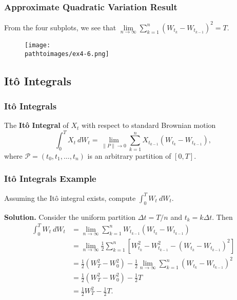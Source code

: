 \documentclass{beamer}
\newcommand{\pathtoimages}{/Users/charlesrambo/Desktop/Bootcamp24/Images}
\begin{document}
\begin{frame}[fragile]
\frametitle{Approximate Quadratic Variation Result}
From the four subplots, we see that $\lim\limits_{n\to\infty} \sum_{k = 1}^n \left(W_{t_k} - W_{t_{k - 1}}\right)^2 = T$.
\begin{figure}
\centering
\texttt{[image: \\pathtoimages/ex4-6.png]}
\end{figure}
\end{frame}



\subsection{It\^o Integrals}

\begin{frame}
\frametitle{It\^o Integrals}
\begin{Definition}
The {\bf It\^o Integral} of $X_t$ with respect to standard Brownian motion
$$
\int_0^T X_t\ dW_t = \lim_{\| P\|\to 0} \sum_{k = 1}^{n } X_{t_{k - 1}} (W_{t_k} - W_{t_{k - 1}}),
$$
where $\mathcal{P} = (t_0, t_1,\ldots, t_n)$ is an arbitrary partition of $[0, T]$.
\end{Definition}

\end{frame}

\begin{frame}
\frametitle{It\^o Integrals Example}
\small 
\begin{Example}
Assuming the It\^o integral exists, compute $\int_0^T W_t\ dW_t$.
\end{Example}

{\bf Solution.}
Consider the uniform partition $\Delta t = T/n$ and $t_k = k \Delta t$. Then
\begin{align*}
\int_0^ T W_t\ dW_t 	&= \lim_{n\to\infty}\sum_{k = 1}^n W_{t_{k - 1}} \left(W_{t_k} - W_{t_{k - 1}}\right)\\
				&= \lim_{n\to\infty}\frac{1}{2} \sum_{k = 1}^n \left[ W_{t_k}^2 - W_{t_{k - 1}}^2 - (W_{t_k} - W_{t_{k - 1}})^2\right]\\
				&=  \frac{1}{2} (W_{T}^2 - W_0^2) - \frac{1}{2}\lim_{n\to\infty} \sum_{k = 1}^n (W_{t_k} - W_{t_{k - 1}})^2\\
				&= \frac{1}{2} (W_{T}^2 - W_0^2) - \frac{1}{2}T\\
				&= \frac{1}{2} W_{T}^2 - \frac{1}{2}T.
\end{align*}

\end{frame}
\end{document}
